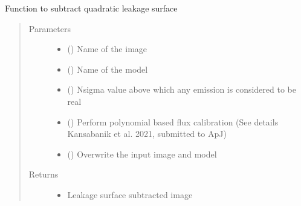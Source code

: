 \documentclass[letterpaper,10pt,english]{sphinxmanual}
\begin{document}
\begin{fulllineitems}
\begin{fulllineitems}
\label{\detokenize{paircars:paircars.fullpol_selfcal_LTS.PolSelfcal.subtract_leakage_surface}}
\sphinxAtStartPar
Function to subtract quadratic leakage surface
\begin{quote}\begin{description}
\item[{Parameters}] \leavevmode\begin{itemize}
\item {} 
\sphinxAtStartPar
{} () \textendash{} Name of the image

\item {} 
\sphinxAtStartPar
{} () \textendash{} Name of the model

\item {} 
\sphinxAtStartPar
{} () \textendash{} N\sphinxhyphen{}sigma value above which any emission is considered to be real

\item {} 
\sphinxAtStartPar
{} () \textendash{} Perform polynomial based flux calibration (See details Kansabanik et al. 2021, submitted to ApJ)

\item {} 
\sphinxAtStartPar
{} () \textendash{} Overwrite the input image and model

\end{itemize}

\item[{Returns}] \leavevmode
\sphinxAtStartPar
\begin{itemize}
\item {} 
\sphinxAtStartPar
{} \textendash{} Leakage surface subtracted image


\end{itemize}
\end{description}
\end{quote}
\end{fulllineitems}
\end{fulllineitems}
\end{document}
